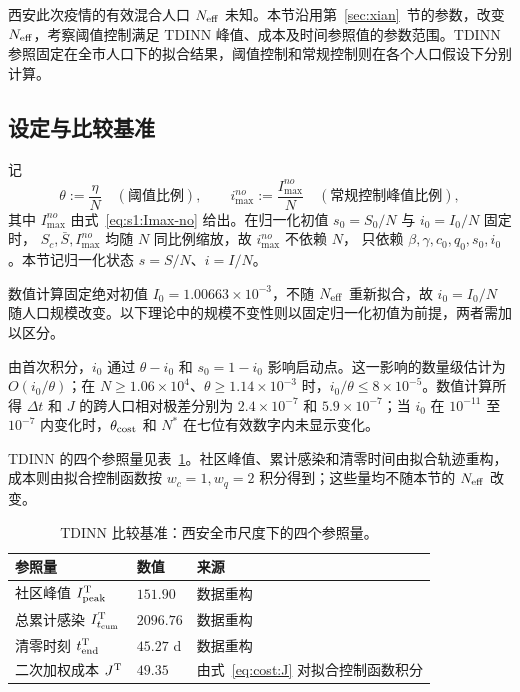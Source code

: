 \documentclass[UTF8,a4paper,10pt,fontset=fandol]{ctexart}
\theoremstyle{cnplain}
\theoremstyle{remark}
\newcommand{\Itcum}{I_{t_{\mathrm{cum}}}}
\numberwithin{equation}{section}
\begin{document}
西安此次疫情的有效混合人口 $N_{\rm eff}$ 未知。本节沿用第~\ref{sec:xian}~节的参数，改变 $N_{\rm eff}$，考察阈值控制满足 TDINN 峰值、成本及时间参照值的参数范围。TDINN 参照固定在全市人口下的拟合结果，阈值控制和常规控制则在各个人口假设下分别计算。

\subsection{设定与比较基准}
\label{sec:dom:setup}

记
\begin{equation}
  \theta:=\frac{\eta}{N}\quad(\text{阈值比例}),\qquad
  i_{\max}^{no}:=\frac{I_{\max}^{no}}{N}\quad(\text{常规控制峰值比例}),
  \label{eq:dom:ratios}
\end{equation}
其中 $I_{\max}^{no}$ 由式~\eqref{eq:s1:Imax-no} 给出。在归一化初值 $s_0=S_0/N$ 与 $i_0=I_0/N$ 固定时，
$S_c,\bar S,I_{\max}^{no}$ 均随 $N$ 同比例缩放，故 $i_{\max}^{no}$ 不依赖 $N$，
只依赖 $\beta,\gamma,c_0,q_0,s_0,i_0$。本节记归一化状态 $s=S/N$、$i=I/N$。

数值计算固定绝对初值 $I_0=1.00663\times10^{-3}$，不随 $N_{\rm eff}$ 重新拟合，故 $i_0=I_0/N$ 随人口规模改变。以下理论中的规模不变性则以固定归一化初值为前提，两者需加以区分。

由首次积分，$i_0$ 通过 $\theta-i_0$ 和 $s_0=1-i_0$ 影响启动点。这一影响的数量级估计为 $O(i_0/\theta)$；在 $N\ge1.06\times10^4$、$\theta\ge1.14\times10^{-3}$ 时，$i_0/\theta\le8\times10^{-5}$。数值计算所得 $\Delta t$ 和 $J$ 的跨人口相对极差分别为 $2.4\times10^{-7}$ 和 $5.9\times10^{-7}$；当 $i_0$ 在 $10^{-11}$ 至 $10^{-7}$ 内变化时，$\theta_{\rm cost}$ 和 $N^\ast$ 在七位有效数字内未显示变化。

TDINN 的四个参照量见表~\ref{tab:dom:tdinn}。社区峰值、累计感染和清零时间由拟合轨迹重构，成本则由拟合控制函数按 $w_c=1,w_q=2$ 积分得到；这些量均不随本节的 $N_{\rm eff}$ 改变。

\begin{table}[htbp]
  \centering
  \footnotesize
  \caption{TDINN 比较基准：西安全市尺度下的四个参照量。}
  \label{tab:dom:tdinn}
  \begin{tabular}{lll}
    \toprule
    参照量 & 数值 & 来源 \\
    \midrule
    社区峰值 $I_{\rm peak}^{\rm T}$ & $151.90$ & 数据重构 \\
    总累计感染 $\Itcum^{\rm T}$ & $2096.76$ & 数据重构 \\
    清零时刻 $t_{\rm end}^{\rm T}$ & $45.27$ d & 数据重构 \\
    二次加权成本 $J^{\rm T}$ & $49.35$ & 由式~\eqref{eq:cost:J} 对拟合控制函数积分 \\
    \bottomrule
  \end{tabular}
\end{table}
\end{document}
